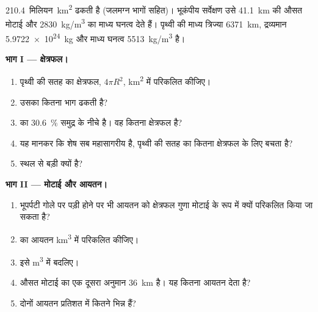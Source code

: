 \begin{problem}[{सप्ताहांत समस्या --- महाद्वीपों का द्रव्यमान}]
\label{pb:g12:continental-crust:1}
 \num{210.4}~मिलियन~\unit{km^2} ढकती है (जलमग्न भागों
सहित)। भूकंपीय सर्वेक्षण उसे \qty{41.1}{km} की औसत मोटाई और
\qty{2830}{kg/m^3} का माध्य घनत्व देते हैं। पृथ्वी की माध्य त्रिज्या
\qty{6371}{km}, द्रव्यमान \qty{5.9722e24}{kg} और माध्य घनत्व
\qty{5513}{kg/m^3} है।

\medskip
\noindent\textbf{भाग I --- क्षेत्रफल।}
\begin{enumerate}
  \item पृथ्वी की सतह का क्षेत्रफल, $4\pi R^2$, \unit{km^2} में
        परिकलित कीजिए।
  \item {} उसका कितना भाग ढकती है?
  \item {} का \qty{30.6}{\percent} समुद्र के नीचे है।
        वह कितना क्षेत्रफल है?
  \item यह मानकर कि शेष सब महासागरीय है, पृथ्वी की सतह का कितना क्षेत्रफल
         के लिए बचता है?
  \item {} स्थल से बड़ी क्यों है?
\end{enumerate}

\medskip
\noindent\textbf{भाग II --- मोटाई और आयतन।}
\begin{enumerate}[resume]
  \item भूपर्पटी गोले पर पड़ी होने पर भी आयतन को क्षेत्रफल गुणा मोटाई के रूप में
        क्यों परिकलित किया जा सकता है?
  \item {} का आयतन \unit{km^3} में परिकलित कीजिए।
  \item इसे \unit{m^3} में बदलिए।
  \item औसत मोटाई का एक दूसरा अनुमान \qty{36}{km} है। यह कितना
        आयतन देता है?
  \item दोनों आयतन प्रतिशत में कितने भिन्न हैं?
\end{enumerate}


\end{problem}
